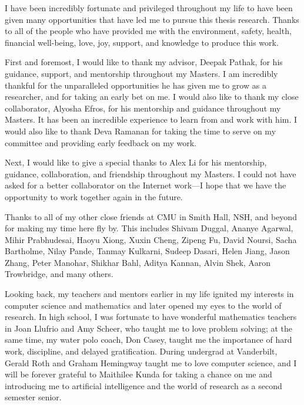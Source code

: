 \begin{acknowledgments}
    I have been incredibly fortunate and privileged throughout my life to have been given many opportunities that have led me to pursue this thesis research. Thanks to all of the people who have provided me with the environment, safety, health, financial well-being, love, joy, support, and knowledge to produce this work.

    First and foremost, I would like to thank my advisor, Deepak Pathak, for his guidance, support, and mentorship throughout my Masters.
    I am incredibly thankful for the unparalleled opportunities he has given me to grow as a researcher, and for taking an early bet on me.
    I would also like to thank my close collaborator, Alyosha Efros, for his mentorship and guidance throughout my Masters. It has been an incredible experience to learn from and work with him.
    I would also like to thank Deva Ramanan for taking the time to serve on my committee and providing early feedback on my work.

    Next, I would like to give a special thanks to Alex Li for his mentorship, guidance, collaboration, and friendship throughout my Masters. I could not have asked for a better collaborator on the Internet work---I hope that we have the opportunity to work together again in the future.

    Thanks to all of my other close friends at CMU in Smith Hall, NSH, and beyond for making my time here fly by. This includes
    Shivam Duggal,
    Ananye Agarwal,
    Mihir Prabhudesai,
    Haoyu Xiong,
    Xuxin Cheng,
    Zipeng Fu,
    David Noursi,
    Sacha Bartholme,
    Nilay Pande,
    Tanmay Kulkarni,
    Sudeep Dasari,
    Helen Jiang,
    Jason Zhang,
    Peter Manohar,
    Shikhar Bahl,
    Aditya Kannan,
    Alvin Shek,
    Aaron Trowbridge,
    and many others.

    Looking back, my teachers and mentors earlier in my life ignited my interests in computer science and mathematics and later opened my eyes to the world of research.
    In high school,
    I was fortunate to have wonderful mathematics teachers in
    Joan Llufrio and Amy Scheer, who taught me to love problem solving;
    at the same time, my water polo coach, Don Casey, taught me the importance of hard work, discipline, and delayed gratification.
    During undergrad at Vanderbilt,
    Gerald Roth and Graham Hemingway taught me to love computer science, and I will be forever grateful to Maithilee Kunda for taking a chance on me and introducing me to artificial intelligence and the world of research as a second semester senior.
    

\end{acknowledgments}

